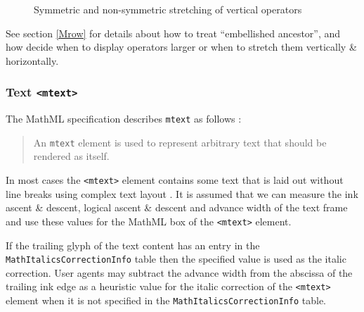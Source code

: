 \begin{figure}
\centering
\caption{Symmetric and non-symmetric stretching of vertical operators}
\label{fig:SymmetricNonSymmetricOperators}
\end{figure}

See section \ref{Mrow} for details about how to treat ``embellished ancestor'',
and how decide when to display operators larger or when to stretch them
vertically \& horizontally.

\subsubsection{Text {\tt <mtext>}}

The MathML specification describes {\tt mtext} as follows \cite{MathML3}:
%
\begin{quote}
  An {\tt mtext} element is used to represent arbitrary text that should be
  rendered as itself.
\end{quote}

In most cases the {\tt <mtext>} element contains some text that is laid out
without line
breaks using complex text layout \cite{CTL}. It is assumed that we can measure
the ink ascent \& descent, logical ascent \& descent and advance width of
the text frame and use these values for the MathML box of the {\tt <mtext>}
element.

If the trailing glyph of the text content has an entry in the
{\tt MathItalicsCorrectionInfo} table then the specified
value is used as the italic correction.
User agents may subtract the advance width from the abscissa of the trailing
ink edge as a heuristic value for the italic correction of the {\tt <mtext>}
element when it is not specified in the
{\tt MathItalicsCorrectionInfo} table.

